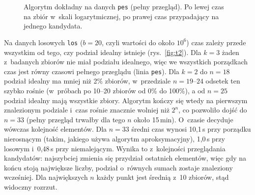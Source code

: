 \documentclass[11pt]{article}
\begin{document}
\begin{figure}[htbp]
    \centering
    \caption{Algorytm dokładny na danych \texttt{pes} (pełny przegląd). Po lewej czas na
             zbiór w~skali logarytmicznej, po prawej czas przypadający na jednego kandydata.}
    \label{fig:t1}
\end{figure}

Na danych losowych \texttt{los} (\(b=20\), czyli wartości do około \(10^6\)) czas zależy
przede wszystkim od tego, czy podział idealny istnieje (rys.~\ref{fig:t2}). Dla \(k=3\)
żaden z~badanych zbiorów nie miał podziału idealnego, więc we wszystkich porządkach czas
jest równy czasowi pełnego przeglądu (linia \texttt{pes}). Dla \(k=2\) do \(n=18\) podział
idealny ma mniej niż 2\% zbiorów, w~przedziale \(n=19\)--\(24\) odsetek ten szybko rośnie
(w~próbach po 10--20 zbiorów od 0\% do 100\%), a od \(n=25\) podział idealny mają wszystkie
zbiory. Algorytm kończy się wtedy na pierwszym znalezionym podziale i~czas rośnie
znacznie wolniej niż \(2^n\), co pozwoliło dojść do \(n=33\) (pełny przegląd trwałby dla
tego \(n\) około 15\,min). O~czasie decyduje wówczas kolejność elementów. Dla \(n=33\)
średni czas wynosi 10,1\,s przy porządku nierosnącym (takim, jakiego używa algorytm
aproksymacyjny), 1,0\,s przy losowym i~0,48\,s przy niemalejącym. Wynika to z~kolejności
przeglądania kandydatów: najszybciej zmienia się przydział ostatnich elementów, więc gdy na
końcu stoją największe liczby, podział o~równych sumach zostaje znaleziony wcześniej.
Dla największych \(n\) każdy punkt jest średnią z~10 zbiorów, stąd widoczny rozrzut.
\end{document}

